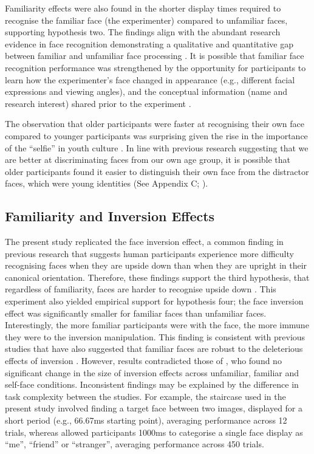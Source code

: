\documentclass[
  10pt,
  letterpaper,
]{article}
\begin{document}
Familiarity effects were also found in the shorter display times
required to recognise the familiar face (the experimenter) compared to
unfamiliar faces, supporting hypothesis two. The findings align with the
abundant research evidence in face recognition demonstrating a
qualitative and quantitative gap between familiar and unfamiliar face
processing \citep{burton2013a, burton2016a, ramon2017a}. It is possible
that familiar face recognition performance was strengthened by the
opportunity for participants to learn how the experimenter's face
changed in appearance (e.g., different facial expressions and viewing
angles), and the conceptual information (name and research interest)
shared prior to the experiment \citep{dowsett2016a}.

The observation that older participants were faster at recognising their
own face compared to younger participants was surprising given the rise
in the importance of the ``selfie'' in youth culture
\citep{tshidzumba2019a}. In line with previous research suggesting that
we are better at discriminating faces from our own age group, it is
possible that older participants found it easier to distinguish their
own face from the distractor faces, which were young identities (See
Appendix C; \citet{rhodes2012a}).

\subsection{Familiarity and Inversion
Effects}\label{familiarity-and-inversion-effects}

The present study replicated the face inversion effect, a common finding
in previous research that suggests human participants experience more
difficulty recognising faces when they are upside down than when they
are upright in their canonical orientation. Therefore, these findings
support the third hypothesis, that regardless of familiarity, faces are
harder to recognise upside down
\citep{allen-davidian2021a, kramer2018a, taubert2011a, young2017a}. This
experiment also yielded empirical support for hypothesis four; the face
inversion effect was significantly smaller for familiar faces than
unfamiliar faces. Interestingly, the more familiar participants were
with the face, the more immune they were to the inversion manipulation.
This finding is consistent with previous studies that have also
suggested that familiar faces are robust to the deleterious effects of
inversion \citep{keyes2012a, keyes2010a, yang2014a}. However, results
contradicted those of \citet{alzueta2019a}, who found no significant
change in the size of inversion effects across unfamiliar, familiar and
self-face conditions. Inconsistent findings may be explained by the
difference in task complexity between the studies. For example, the
staircase used in the present study involved finding a target face
between two images, displayed for a short period (e.g., 66.67ms starting
point), averaging performance across 12 trials, whereas
\citet{alzueta2019a} allowed participants 1000ms to categorise a single
face display as ``me'', ``friend'' or ``stranger'', averaging
performance across 450 trials.
\end{document}
